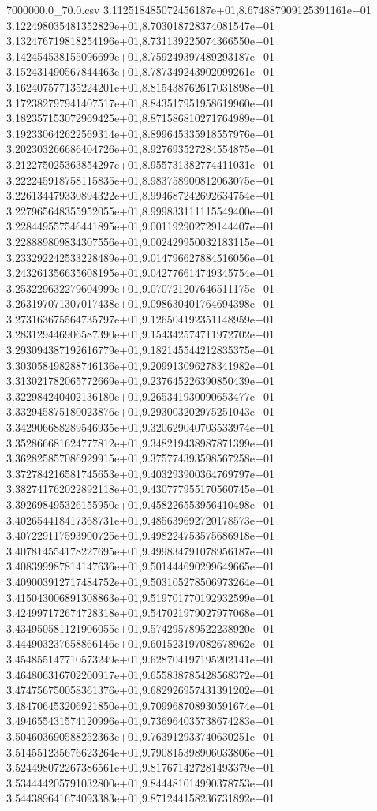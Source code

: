 \begin{filecontents*}{7000000.0_70.0.csv}
3.112518485072456187e+01,8.674887909125391161e+01
3.122498035481352829e+01,8.703018728374081547e+01
3.132476719818254196e+01,8.731139225074366550e+01
3.142454538155096699e+01,8.759249397489293187e+01
3.152431490567844463e+01,8.787349243902099261e+01
3.162407577135224201e+01,8.815438762617031898e+01
3.172382797941407517e+01,8.843517951958619960e+01
3.182357153072969425e+01,8.871586810271764989e+01
3.192330642622569314e+01,8.899645335918557976e+01
3.202303266686404726e+01,8.927693527284554875e+01
3.212275025363854297e+01,8.955731382774411031e+01
3.222245918758115835e+01,8.983758900812063075e+01
3.226134479330894322e+01,8.994687242692634754e+01
3.227965648355952055e+01,8.999833111115549400e+01
3.228449557546441895e+01,9.001192902729144407e+01
3.228889809834307556e+01,9.002429950032183115e+01
3.233292242533228489e+01,9.014796627884516056e+01
3.243261356635608195e+01,9.042776614749345754e+01
3.253229632279604999e+01,9.070721207646511175e+01
3.263197071307017438e+01,9.098630401764694398e+01
3.273163675564735797e+01,9.126504192351148959e+01
3.283129446906587390e+01,9.154342574711972702e+01
3.293094387192616779e+01,9.182145544212835375e+01
3.303058498288746136e+01,9.209913096278341982e+01
3.313021782065772669e+01,9.237645226390850439e+01
3.322984240402136180e+01,9.265341930090653477e+01
3.332945875180023876e+01,9.293003202975251043e+01
3.342906688289546935e+01,9.320629040703533974e+01
3.352866681624777812e+01,9.348219438987871399e+01
3.362825857086929915e+01,9.375774393598567258e+01
3.372784216581745653e+01,9.403293900364769797e+01
3.382741762022892118e+01,9.430777955170560745e+01
3.392698495326155950e+01,9.458226553956410498e+01
3.402654418417368731e+01,9.485639692720178573e+01
3.407229117593900725e+01,9.498224753575686918e+01
3.407814554178227695e+01,9.499834791078956187e+01
3.408399987814147636e+01,9.501444690299649665e+01
3.409003912717484752e+01,9.503105278506973264e+01
3.415043006891308863e+01,9.519701770192932599e+01
3.424997172674728318e+01,9.547021979027977068e+01
3.434950581121906055e+01,9.574295789522238920e+01
3.444903237658866146e+01,9.601523197082678962e+01
3.454855147710573249e+01,9.628704197195202141e+01
3.464806316702200917e+01,9.655838785428568372e+01
3.474756750058361376e+01,9.682926957431391202e+01
3.484706453206921850e+01,9.709968708930591674e+01
3.494655431574120996e+01,9.736964035738674283e+01
3.504603690588252363e+01,9.763912933740630251e+01
3.514551235676623264e+01,9.790815398906033806e+01
3.524498072267386561e+01,9.817671427281493379e+01
3.534444205791032800e+01,9.844481014990378753e+01
3.544389641674093383e+01,9.871244158236731892e+01

\end{filecontents*}
